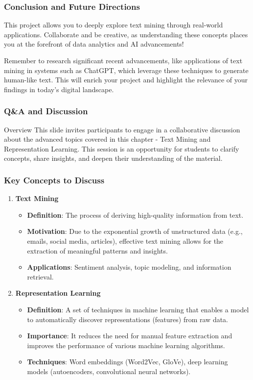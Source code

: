 \documentclass[aspectratio=169]{beamer}
\begin{document}
\begin{frame}[fragile]
    \frametitle{Conclusion and Future Directions}
    This project allows you to deeply explore text mining through real-world applications. Collaborate and be creative, as understanding these concepts places you at the forefront of data analytics and AI advancements!

    Remember to research significant recent advancements, like applications of text mining in systems such as ChatGPT, which leverage these techniques to generate human-like text. This will enrich your project and highlight the relevance of your findings in today's digital landscape.
\end{frame}

\begin{frame}[fragile]
    \frametitle{Q\&A and Discussion}
    \begin{block}{Overview}
        This slide invites participants to engage in a collaborative discussion about the advanced topics covered in this chapter - Text Mining and Representation Learning. 
        This session is an opportunity for students to clarify concepts, share insights, and deepen their understanding of the material.
    \end{block}
\end{frame}

\begin{frame}[fragile]
    \frametitle{Key Concepts to Discuss}
    \begin{enumerate}
        \item \textbf{Text Mining}
            \begin{itemize}
                \item \textbf{Definition}: The process of deriving high-quality information from text.
                \item \textbf{Motivation}: Due to the exponential growth of unstructured data (e.g., emails, social media, articles), effective text mining allows for the extraction of meaningful patterns and insights.
                \item \textbf{Applications}: Sentiment analysis, topic modeling, and information retrieval.
            \end{itemize}

        \item \textbf{Representation Learning}
            \begin{itemize}
                \item \textbf{Definition}: A set of techniques in machine learning that enables a model to automatically discover representations (features) from raw data.
                \item \textbf{Importance}: It reduces the need for manual feature extraction and improves the performance of various machine learning algorithms.
                \item \textbf{Techniques}: Word embeddings (Word2Vec, GloVe), deep learning models (autoencoders, convolutional neural networks).
            \end{itemize}
    \end{enumerate}
\end{frame}
\end{document}
